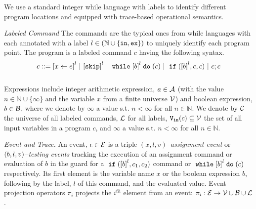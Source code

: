 We use a standard integer while language with labels to identify different program locations and equipped with trace-based operational semantics.

\emph{Labeled Command}
The commands are the typical ones from while languages with each annotated with a label $l \in (\mathbb{N} \cup \{\mathtt{in}, \mathtt{ex}\})$ to uniquely identify each program point. The program is a labeled command $c$ having the following syntax. 
\\
\[
{c} ::= 
\clabel{\assign{x}{\expr}}^l 
~|~ \clabel{\eskip}^l
~|~ \ewhile \clabel{\bexpr}^{l} \edo ({c})
~|~ \eif(\clabel{\bexpr}^{l} , {c}, {c}) 
~|~ {c};{c} 
\]
\\
Expressions include
integer arithmetic expression, $a \in \mathcal{A}$ (with the value $n \in \mathbb{N} \cup \{ \infty\}$ and the variable $x$ from a finite universe $\mathcal{V}$) and boolean expression, $b \in \mathcal{B}$, where we denote by $\infty$ a value s.t. $n < \infty $ for all $n \in \mathbb{N}$.
We denote by $\mathcal{C}$ the universe of all labeled commands, $\mathcal{L}$ for all labels,
${\mathtt{V_{\mathtt{in}}}}(c) \subseteq \mathcal{V}$ the set of all input variables in a program $c$,
and $\infty$ a value s.t. $n < \infty $ for all $n \in \mathbb{N}$.


\emph{Event and Trace.}
An event, $\mathtt{\epsilon} \in \mathcal{E}$ is a triple $({x}, l, v)$--\emph{assignment event} or $(b, l, v)$--\emph{testing events} tracking the execution of an assignment command or evaluation of $b$ in
the guard for a $\eif(\clabel{b}^l, c_1, c_2)$ command or $\ewhile \clabel{b}^l \edo (c)$ respectively.
Its first element is the variable name $x$
or the boolean expression $b$, 
following by 
the label, $l$ of this command, and the evaluated value.
Event projection operators $\pi_i$ projects the $i^{th}$ element from an event: 
$\pi_i : \mathcal{E} \to \mathcal{V} \cup \mathcal{B} \cup \mathcal{L} $.


